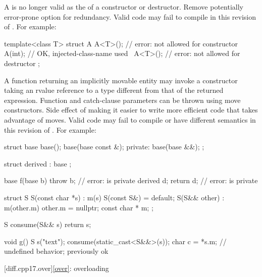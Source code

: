 \change
A 
is no longer valid as the  of a constructor or destructor.
\rationale
Remove potentially error-prone option for redundancy.
\effect
Valid \CppXVII{} code may fail to compile
in this revision of \Cpp{}.
For example:
\begin{codeblock}
template<class T>
struct A {
  A<T>();           // error:  not allowed for constructor
  A(int);           // OK, injected-class-name used
  ~A<T>();          // error:  not allowed for destructor
};
\end{codeblock}

\change
A function returning an implicitly movable entity
may invoke a constructor taking an rvalue reference to a type
different from that of the returned expression.
Function and catch-clause parameters can be thrown using move constructors.
\rationale
Side effect of making it easier to write
more efficient code that takes advantage of moves.
\effect
Valid \CppXVII{} code may fail to compile or have different semantics
in this revision of \Cpp{}.
For example:
\begin{codeblock}
struct base {
  base();
  base(base const &);
private:
  base(base &&);
};

struct derived : base {};

base f(base b) {
  throw b;                      // error:  is private
  derived d;
  return d;                     // error:  is private
}

struct S {
  S(const char *s) : m(s) { }
  S(const S&) = default;
  S(S&& other) : m(other.m) { other.m = nullptr; }
  const char * m;
};

S consume(S&& s) { return s; }

void g() {
  S s("text");
  consume(static_cast<S&&>(s));
  char c = *s.m;                // undefined behavior; previously ok
}
\end{codeblock}

[diff.cpp17.over]{\ref{over}: overloading}

